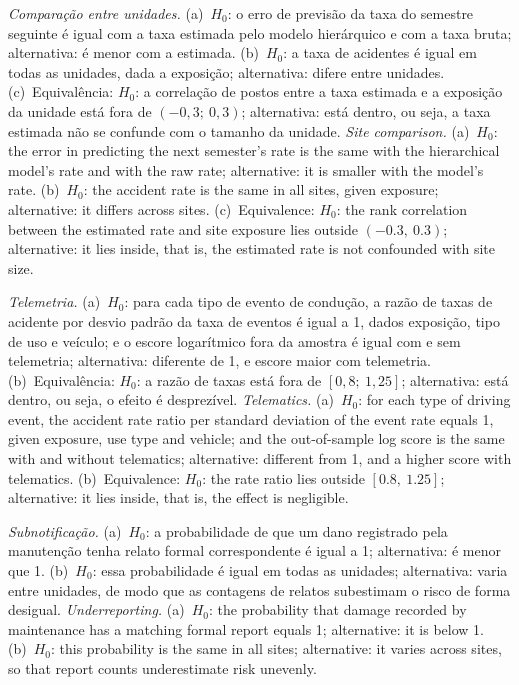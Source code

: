 \begin{description}[leftmargin=1.2cm,style=nextline]
  \item[H1] \tr%
    {\textit{Comparação entre unidades.} (a)~$H_0$: o erro de previsão da taxa do semestre seguinte é igual com a taxa estimada pelo modelo hierárquico e com a taxa bruta; alternativa: é menor com a estimada. (b)~$H_0$: a taxa de acidentes é igual em todas as unidades, dada a exposição; alternativa: difere entre unidades. (c)~Equivalência: $H_0$: a correlação de postos entre a taxa estimada e a exposição da unidade está fora de $(-0{,}3;\ 0{,}3)$; alternativa: está dentro, ou seja, a taxa estimada não se confunde com o tamanho da unidade.}%
    {\textit{Site comparison.} (a)~$H_0$: the error in predicting the next semester's rate is the same with the hierarchical model's rate and with the raw rate; alternative: it is smaller with the model's rate. (b)~$H_0$: the accident rate is the same in all sites, given exposure; alternative: it differs across sites. (c)~Equivalence: $H_0$: the rank correlation between the estimated rate and site exposure lies outside $(-0.3,\ 0.3)$; alternative: it lies inside, that is, the estimated rate is not confounded with site size.}
  \item[H2] \tr%
    {\textit{Telemetria.} (a)~$H_0$: para cada tipo de evento de condução, a razão de taxas de acidente por desvio padrão da taxa de eventos é igual a 1, dados exposição, tipo de uso e veículo; e o escore logarítmico fora da amostra é igual com e sem telemetria; alternativa: diferente de 1, e escore maior com telemetria. (b)~Equivalência: $H_0$: a razão de taxas está fora de $[0{,}8;\ 1{,}25]$; alternativa: está dentro, ou seja, o efeito é desprezível.}%
    {\textit{Telematics.} (a)~$H_0$: for each type of driving event, the accident rate ratio per standard deviation of the event rate equals 1, given exposure, use type and vehicle; and the out-of-sample log score is the same with and without telematics; alternative: different from 1, and a higher score with telematics. (b)~Equivalence: $H_0$: the rate ratio lies outside $[0.8,\ 1.25]$; alternative: it lies inside, that is, the effect is negligible.}
  \item[H3] \tr%
    {\textit{Subnotificação.} (a)~$H_0$: a probabilidade de que um dano registrado pela manutenção tenha relato formal correspondente é igual a 1; alternativa: é menor que 1. (b)~$H_0$: essa probabilidade é igual em todas as unidades; alternativa: varia entre unidades, de modo que as contagens de relatos subestimam o risco de forma desigual.}%
    {\textit{Underreporting.} (a)~$H_0$: the probability that damage recorded by maintenance has a matching formal report equals 1; alternative: it is below 1. (b)~$H_0$: this probability is the same in all sites; alternative: it varies across sites, so that report counts underestimate risk unevenly.}
\end{description}

